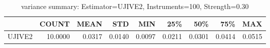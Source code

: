 \begin{table}[ht]
\centering
\caption{variance summary: Estimator=UJIVE2, Instruments=100, Strength=0.30}
\begin{tabular}{lrrrrrrrr}
\toprule
 & COUNT & MEAN & STD & MIN & 25\% & 50\% & 75\% & MAX \\
\midrule
UJIVE2 & 10.0000 & 0.0317 & 0.0140 & 0.0097 & 0.0211 & 0.0301 & 0.0414 & 0.0515 \\
\bottomrule
\end{tabular}
\end{table}
